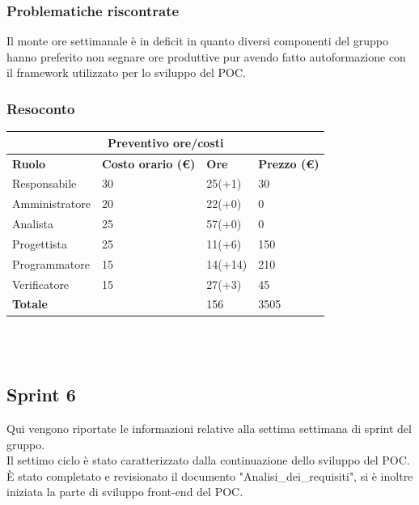 \documentclass[12pt]{article}
\begin{document}
\subsubsection{Problematiche riscontrate}
Il monte ore settimanale è in deficit in quanto diversi componenti del gruppo hanno preferito non segnare ore produttive pur avendo fatto autoformazione con il framework utilizzato per lo sviluppo del POC.
\subsubsection{Resoconto}
\begin{center}
	\begin{tabularx}{\textwidth}{|X|X|X|X|}
		\hline
		\multicolumn{4}{|c|}{\textbf{Preventivo ore/costi}}                                      \\
		\hline
		\hline
		\textbf{Ruolo}  & \textbf{Costo orario (\euro)} & \textbf{Ore} & \textbf{Prezzo (\euro)} \\
		\hline
		Responsabile    & 30                            & 25(+1)       & 30                      \\
		\hline
		Amministratore  & 20                            & 22(+0)       & 0                       \\
		\hline
		Analista        & 25                            & 57(+0)       & 0                       \\
		\hline
		Progettista     & 25                            & 11(+6)       & 150                     \\
		\hline
		Programmatore   & 15                            & 14(+14)      & 210                     \\
		\hline
		Verificatore    & 15                            & 27(+3)       & 45                      \\
		\hline
		\hline
		\textbf{Totale} &                               & 156          & 3505                    \\
		\hline
	\end{tabularx}\\[8pt]
	\mbox{}\\
\end{center}

\subsection{Sprint 6}
Qui vengono riportate le informazioni relative alla settima settimana di sprint del gruppo. \\
Il settimo ciclo è stato caratterizzato dalla continuazione dello sviluppo del POC. \\
È stato completato e revisionato il documento "Analisi\_dei\_requisiti", si è inoltre iniziata la parte di sviluppo front-end del POC.
\end{document}
